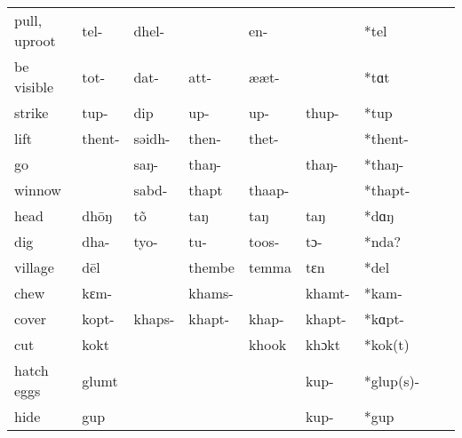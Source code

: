 \documentclass[xcolor=table]{beamer}
\newcommand{\ipa}[1]{{\phon \mbox{#1}}} %
\begin{document}
\begin{frame}
\begin{table}[h]
\begin{tabular}{lllllllll}
pull, uproot  & 	\ipa{tel-} &	\ipa{dhel-} &	\ipa{} &	\ipa{en-} &	\ipa{} &	\ipa{*tel} &	\\	
be visible  & 	\ipa{tot-} &	\ipa{dat-} &	\ipa{att-} &	\ipa{ææt-} &	\ipa{} &	\ipa{*tɑt} &	\\	
strike  & 	\ipa{tup-} &	\ipa{dip} &	\ipa{up-} &	\ipa{up-} &	\ipa{thup-} &	\ipa{*tup} &	\\	
  \midrule
lift  & 	\ipa{thent-} &	\ipa{səidh-} &	\ipa{then-} &	\ipa{thet-} &	\ipa{} &	\ipa{*thent-} &	\\	
go  & 	\ipa{} &	\ipa{saŋ-} &	\ipa{thaŋ-} &	\ipa{} &	\ipa{thaŋ-} &	\ipa{*thaŋ-} &	\\	
winnow  & 	\ipa{} &	\ipa{sabd-} &	\ipa{thapt} &	\ipa{thaap-} &	\ipa{} &	\ipa{*thapt-} &	\\
  \midrule	
head  & 	\ipa{dhōŋ} &	\ipa{tõ} &	\ipa{taŋ} &	\ipa{taŋ} &	\ipa{taŋ} &	\ipa{*dɑŋ} &	\\	
dig  & 	\ipa{dha-} &	\ipa{tyo-} &	\ipa{tu-} &	\ipa{toos-} &	\ipa{tɔ-} &	\ipa{*nda?} &	\\	
village  & 	\ipa{dēl} &	\ipa{} &	\ipa{thembe} &	\ipa{temma} &	\ipa{tɛn} &	\ipa{*del} &	\\	
 \midrule
chew  & 	\ipa{kɛm-} &	\ipa{} &	\ipa{khams-} &	\ipa{} &	\ipa{khamt-} &	\ipa{*kam-} &	\\	
cover  & 	\ipa{kopt-} &	\ipa{khaps-} &	\ipa{khapt-} &	\ipa{khap-} &	\ipa{khapt-} &	\ipa{*kɑpt-} &	\\	
cut  & 	\ipa{kokt} &	\ipa{} &	\ipa{} &	\ipa{khook} &	\ipa{khɔkt} &	\ipa{*kok(t)} &	\\	
hatch eggs  & 	\ipa{glumt} &	\ipa{} &	\ipa{} &	\ipa{} &	\ipa{kup-} &	\ipa{*glup(s)-} &	\\	
hide  & 	\ipa{gup} &	\ipa{} &	\ipa{} &	\ipa{} &	\ipa{kup-} &	\ipa{*gup} &	\\	
  \bottomrule
\end{tabular}
\end{table}
 \end{frame}
\end{document}
